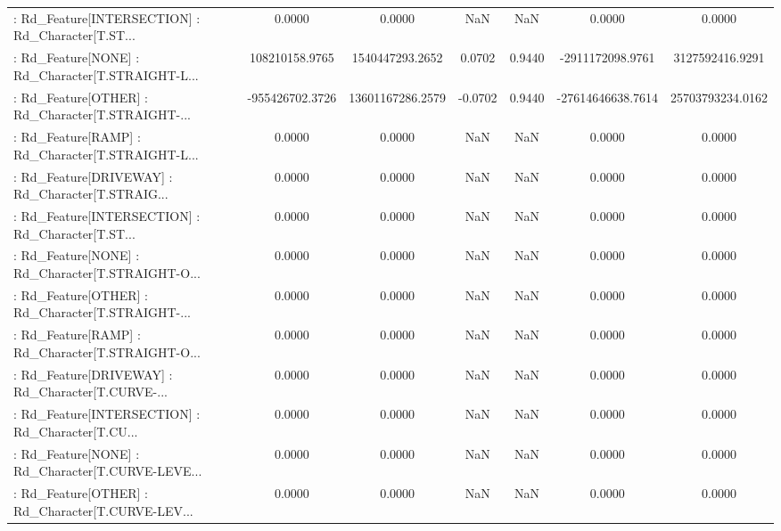 \begin{longtable}{p{4cm}cccccc}
 : Rd\_Feature[INTERSECTION] : Rd\_Character[T.ST... &            0.0000 &            0.0000 &     NaN &          NaN &             0.0000 &            0.0000 \\
 : Rd\_Feature[NONE] : Rd\_Character[T.STRAIGHT-L... &    108210158.9765 &   1540447293.2652 &  0.0702 &       0.9440 &   -2911172098.9761 &   3127592416.9291 \\
 : Rd\_Feature[OTHER] : Rd\_Character[T.STRAIGHT-... &   -955426702.3726 &  13601167286.2579 & -0.0702 &       0.9440 &  -27614646638.7614 &  25703793234.0162 \\
 : Rd\_Feature[RAMP] : Rd\_Character[T.STRAIGHT-L... &            0.0000 &            0.0000 &     NaN &          NaN &             0.0000 &            0.0000 \\
 : Rd\_Feature[DRIVEWAY] : Rd\_Character[T.STRAIG... &            0.0000 &            0.0000 &     NaN &          NaN &             0.0000 &            0.0000 \\
 : Rd\_Feature[INTERSECTION] : Rd\_Character[T.ST... &            0.0000 &            0.0000 &     NaN &          NaN &             0.0000 &            0.0000 \\
 : Rd\_Feature[NONE] : Rd\_Character[T.STRAIGHT-O... &            0.0000 &            0.0000 &     NaN &          NaN &             0.0000 &            0.0000 \\
 : Rd\_Feature[OTHER] : Rd\_Character[T.STRAIGHT-... &            0.0000 &            0.0000 &     NaN &          NaN &             0.0000 &            0.0000 \\
 : Rd\_Feature[RAMP] : Rd\_Character[T.STRAIGHT-O... &            0.0000 &            0.0000 &     NaN &          NaN &             0.0000 &            0.0000 \\
 : Rd\_Feature[DRIVEWAY] : Rd\_Character[T.CURVE-... &            0.0000 &            0.0000 &     NaN &          NaN &             0.0000 &            0.0000 \\
 : Rd\_Feature[INTERSECTION] : Rd\_Character[T.CU... &            0.0000 &            0.0000 &     NaN &          NaN &             0.0000 &            0.0000 \\
 : Rd\_Feature[NONE] : Rd\_Character[T.CURVE-LEVE... &            0.0000 &            0.0000 &     NaN &          NaN &             0.0000 &            0.0000 \\
 : Rd\_Feature[OTHER] : Rd\_Character[T.CURVE-LEV... &            0.0000 &            0.0000 &     NaN &          NaN &             0.0000 &            0.0000 \\

\end{longtable}
